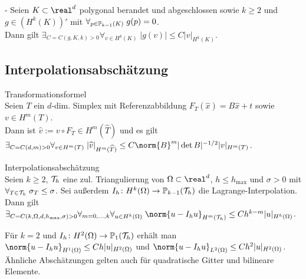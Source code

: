 \linie

\begin{Lemma}{-}
    Seien $K \subset \real^d$ polygonal berandet und abgeschlossen sowie $k \ge 2$ und
    $g \in (H^k(K))'$ mit $\forall_{p \in \mathbb{P}_{k-1}(K)}\; g(p) = 0$.\\
    Dann gilt $\exists_{C = C(g, K, k) > 0}
    \forall_{v \in H^k(K)}\; |g(v)| \le C |v|_{H^k(K)}$.
\end{Lemma}

\pagebreak

\subsection{%
    Interpolationsabschätzung%
}

\begin{Satz}{Transformationsformel}\\
    Seien $T$ ein $d$-dim. Simplex mit Referenzabbildung $F_T(\widehat{x}) = B\widehat{x} + t$
    sowie $v \in H^m(T)$.\\
    Dann ist $\widehat{v} := v \circ F_T \in H^m(\widehat{T})$ und es gilt\\
    $\exists_{C = C(d, m) > 0} \forall_{v \in H^m(T)}\;
    |\widehat{v}|_{H^m(\widehat{T})} \le C \norm{B}^m |\det B|^{-1/2} |v|_{H^m(T)}$.
\end{Satz}

\linie

\begin{Satz}{Interpolationsabschätzung}\\
    Seien $k \ge 2$,
    $\mathcal{T}_h$ eine zul. Triangulierung von $\Omega \subset \real^d$,
    $h \le h_{\max}$ und
    $\sigma > 0$ mit $\forall_{T \in \mathcal{T}_h}\; \sigma_T \le \sigma$.
    Sei außerdem $I_h\colon H^k(\Omega) \to \mathbb{P}_{k-1}(\mathcal{T}_h)$ die Lagrange-Interpolation.\\
    Dann gilt $\exists_{C = C(k, \Omega, d, h_{\max}, \sigma) > 0}
    \forall_{m=0,\dotsc,k} \forall_{u \in H^k(\Omega)}\;
    \norm{u - I_h u}_{H^m(\T_h)} \le Ch^{k-m} |u|_{H^k(\Omega)}$.
\end{Satz}

\begin{Bem}
    Für $k = 2$ und $I_h\colon H^2(\Omega) \to \mathbb{P}_1(\mathcal{T}_h)$ erhält man\\
    $\norm{u - I_h u}_{H^1(\Omega)} \le Ch |u|_{H^2(\Omega)}$ und
    $\norm{u - I_h u}_{L^2(\Omega)} \le Ch^2 |u|_{H^2(\Omega)}$.\\
    Ähnliche Abschätzungen gelten auch für quadratische Gitter und bilineare Elemente.
\end{Bem}

